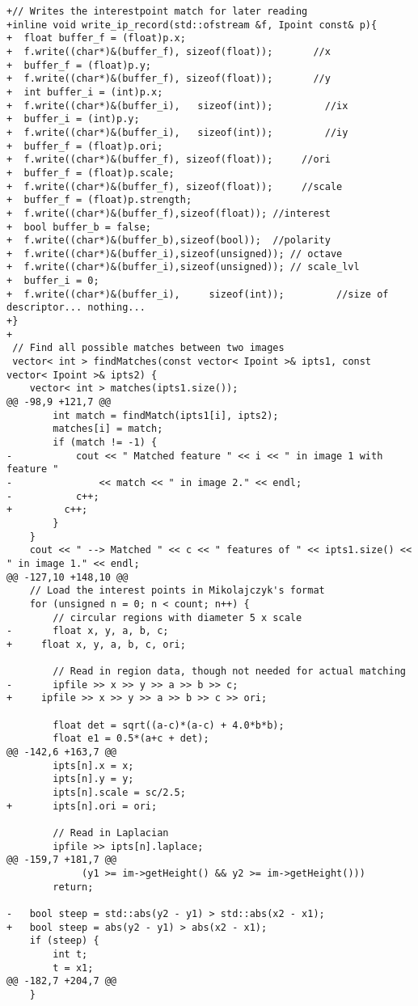 \begin{verbatim}
+// Writes the interestpoint match for later reading
+inline void write_ip_record(std::ofstream &f, Ipoint const& p){
+  float buffer_f = (float)p.x;
+  f.write((char*)&(buffer_f), sizeof(float));       //x
+  buffer_f = (float)p.y;
+  f.write((char*)&(buffer_f), sizeof(float));       //y
+  int buffer_i = (int)p.x;
+  f.write((char*)&(buffer_i),   sizeof(int));         //ix
+  buffer_i = (int)p.y;
+  f.write((char*)&(buffer_i),   sizeof(int));         //iy
+  buffer_f = (float)p.ori;
+  f.write((char*)&(buffer_f), sizeof(float));     //ori
+  buffer_f = (float)p.scale;
+  f.write((char*)&(buffer_f), sizeof(float));     //scale
+  buffer_f = (float)p.strength;
+  f.write((char*)&(buffer_f),sizeof(float)); //interest
+  bool buffer_b = false;
+  f.write((char*)&(buffer_b),sizeof(bool));  //polarity
+  f.write((char*)&(buffer_i),sizeof(unsigned)); // octave
+  f.write((char*)&(buffer_i),sizeof(unsigned)); // scale_lvl
+  buffer_i = 0;
+  f.write((char*)&(buffer_i),     sizeof(int));         //size of descriptor... nothing...                                                                                                
+}  
+
 // Find all possible matches between two images
 vector< int > findMatches(const vector< Ipoint >& ipts1, const vector< Ipoint >& ipts2) {
 	vector< int > matches(ipts1.size());
@@ -98,9 +121,7 @@
 		int match = findMatch(ipts1[i], ipts2);
 		matches[i] = match;
 		if (match != -1) {
-			cout << " Matched feature " << i << " in image 1 with feature "
-				<< match << " in image 2." << endl;
-			c++;
+		  c++;
 		}
 	}
 	cout << " --> Matched " << c << " features of " << ipts1.size() << " in image 1." << endl;
@@ -127,10 +148,10 @@
 	// Load the interest points in Mikolajczyk's format
 	for (unsigned n = 0; n < count; n++) {
 		// circular regions with diameter 5 x scale
-		float x, y, a, b, c;
+	  float x, y, a, b, c, ori;
 
 		// Read in region data, though not needed for actual matching
-		ipfile >> x >> y >> a >> b >> c;
+	  ipfile >> x >> y >> a >> b >> c >> ori;
 
 		float det = sqrt((a-c)*(a-c) + 4.0*b*b);
 		float e1 = 0.5*(a+c + det);
@@ -142,6 +163,7 @@
 		ipts[n].x = x;
 		ipts[n].y = y;
 		ipts[n].scale = sc/2.5;
+		ipts[n].ori = ori;
 
 		// Read in Laplacian
 		ipfile >> ipts[n].laplace;
@@ -159,7 +181,7 @@
             (y1 >= im->getHeight() && y2 >= im->getHeight()))
 		return;
 
-	bool steep = std::abs(y2 - y1) > std::abs(x2 - x1);
+	bool steep = abs(y2 - y1) > abs(x2 - x1);
 	if (steep) {
 		int t;
 		t = x1;
@@ -182,7 +204,7 @@
 	}
 

\end{verbatim}
